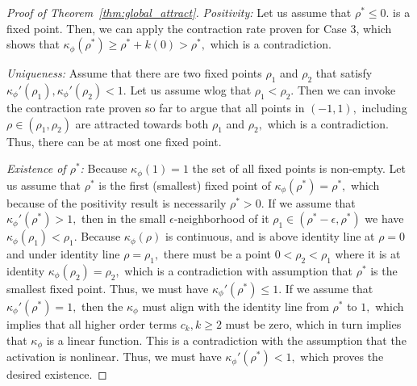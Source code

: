 \documentclass[twoside]{article}
\newcommand{\km}{\kappa_\phi}
\theoremstyle{definition}
\begin{document}
\begin{proof}[Proof of Theorem~\ref{thm:global_attract}]
\textit{Positivity:} Let us assume that $\rho^* \le 0.$ is a fixed point. Then, we can apply the contraction rate proven for Case 3, which shows that $\km(\rho^*)\ge \rho^* + k(0) > \rho^*,$ which is a contradiction.


\textit{Uniqueness:} Assume that there are two fixed points $\rho_1$ and $\rho_2$ that satisfy $\km'(\rho_1),\km'(\rho_2)<1.$ Let us assume wlog that $\rho_1 < \rho_2.$ Then we can invoke the contraction rate proven so far to argue that all points in $(-1,1),$ including  $\rho\in (\rho_1,\rho_2)$ are attracted towards both $\rho_1$ and $\rho_2,$ which is a contradiction. Thus, there can be at most one fixed point.

\textit{Existence of $\rho^*$:} Because $\km(1)=1$ the set of all fixed points is non-empty. Let us assume that $\rho^*$ is the first (smallest) fixed point of $\km(\rho^*) = \rho^*,$ which because of the positivity result is necessarily $\rho^*>0.$ If we assume that $\km'(\rho^*) > 1,$ then in the small $\epsilon$-neighborhood of it $\rho_1 \in(\rho^*-\epsilon,\rho^*)$ we have $\km(\rho_1) < \rho_1.$ Because $\km(\rho)$ is continuous, and is above identity line at $\rho=0$ and under identity line $\rho=\rho_1,$ there must be a point $0 < \rho_2 < \rho_1$ where it is at identity $\km(\rho_2) = \rho_2,$ which is a contradiction with assumption that $\rho^*$ is the smallest fixed point. Thus, we must have $\km'(\rho^*) \le 1.$ If we assume that $\km'(\rho^*) = 1,$ then the $\km$ must align with the identity line from $\rho^*$ to $1,$ which implies that all higher order terms $c_k,k\ge 2$ must be zero, which in turn implies that $\km$ is a linear function. This is a contradiction with the assumption that the activation is nonlinear. Thus, we must have $\km'(\rho^*) < 1,$ which proves the desired existence. 
\end{proof}
\end{document}

